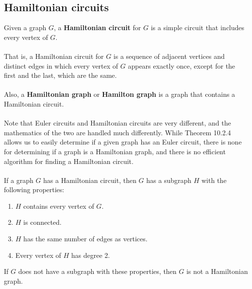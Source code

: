 \documentclass[a4paper]{article}
\begin{document}
\subsection{Hamiltonian circuits}
Given a graph $G$, a \textbf{Hamiltonian circuit} for $G$ is a simple circuit that includes every vertex of $G$.\\\\
That is, a Hamiltonian circuit for $G$ is a sequence of adjacent vertices and distinct edges in which every vertex of $G$ appears exactly once, except for the first and the last, which are the same.\\\\
Also, a \textbf{Hamiltonian graph} or \textbf{Hamilton graph} is a graph that contains a Hamiltonian circuit.\\\\
Note that Euler circuits and Hamiltonian circuits are very different, and the mathematics of the two are handled much differently. While Theorem 10.2.4 allows us to easily determine if a given graph has an Euler circuit, there is none for determining if a graph is a Hamiltonian graph, and there is no efficient algorithm for finding a Hamiltonian circuit.\\\\
If a graph $G$ has a Hamiltonian circuit, then $G$ has a subgraph $H$ with the following properties:
\begin{enumerate}
	\item $H$ contains every vertex of $G$.
	\item $H$ is connected.
	\item $H$ has the same number of edges as vertices.
	\item Every vertex of $H$ has degree 2.
\end{enumerate}
If $G$ does not have a subgraph with these properties, then $G$ is not a Hamiltonian graph.
\end{document}
